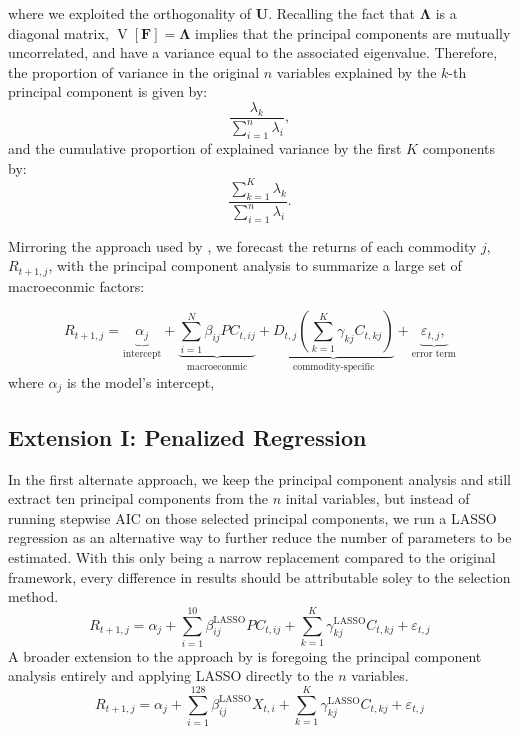 where we exploited the orthogonality of $\mathbf U$. Recalling the fact that $\mathbf \Lambda$ is a diagonal matrix, $\operatorname{V}[\mathbf F]=\mathbf \Lambda$ implies that the principal components are mutually uncorrelated, and have a variance equal to the associated eigenvalue. Therefore, the proportion of variance in the original $n$ variables explained by the $k$-th principal component is given by:
\begin{equation}
    \frac{\lambda_k}{\sum_{i=1}^n\lambda_i},
\end{equation}
and the cumulative proportion of explained  variance by the first $K$ components by:
\begin{equation}
    \frac{\sum_{k=1}^K\lambda_k}{\sum_{i=1}^n\lambda_i}.
\end{equation}

Mirroring the approach used by \textcite{guidolin_forecasting_2021}, we forecast the returns of each commodity $j$, $R_{t+1,j}$, with the principal component analysis to summarize a large set of macroeconmic factors:

\begin{equation}
    R_{t+1, j}
    = \underbrace{\alpha_j}_{\text{intercept}}
    + \underbrace{\sum_{i=1}^N \beta_{i j} P C_{t, i j}}_{\text{macroeconmic}}
    + \underbrace{D_{t, j}\left(\sum_{k=1}^K \gamma_{k j} C_{t, k j}\right)}_{\text{commodity-specific}}
    + \underbrace{\varepsilon_{t, j},}_{\text{error term}}
\end{equation}
where $\alpha_j$ is the model's intercept, 

\subsection{Extension I: Penalized Regression}
In the first alternate approach, we keep the principal component analysis and still extract ten principal components from the $n$ inital variables, but instead of running stepwise AIC on those selected principal components, we run a LASSO regression as an alternative way to further reduce the number of parameters to be estimated. With this only being a narrow replacement compared to the original framework, every difference in results should be attributable soley to the selection method.
\begin{equation}
R_{t+1, j}=\alpha_j+\sum_{i=1}^{10} \beta_{i j}^{\mathrm{LASSO}} P C_{t, i j}+\sum_{k=1}^K \gamma_{k j}^{\mathrm{LASSO}} C_{t, k j}+\varepsilon_{t, j}
\end{equation}
A broader extension to the approach by \textcite{guidolin_forecasting_2021} is foregoing the principal component analysis entirely and applying LASSO directly to the $n$ variables. 
\begin{equation}
R_{t+1, j}=\alpha_j+\sum_{i=1}^{128} \beta_{i j}^{\mathrm{LASSO}} X_{t, i}+\sum_{k=1}^K \gamma_{k j}^{\mathrm{LASSO}} C_{t, k j}+\varepsilon_{t, j}
\end{equation}

